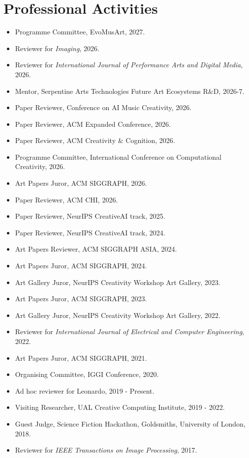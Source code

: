 \documentclass[letterpaper,11pt]{article}
\newcommand{\resumeItem}[2]{
  \item\small{
    \textbf{#1}{ #2 \vspace{-2pt}}
  }
}
\newcommand{\resumeSubItem}[2]{\resumeItem{#1}{#2}\vspace{-4pt}}
\newcommand{\resumeSubHeadingListStart}{\begin{itemize}[leftmargin=*]}
\newcommand{\resumeSubHeadingListEnd}{\end{itemize}}
\begin{document}
\section{Professional Activities}
 \resumeSubHeadingListStart
 \resumeSubItem{}{Programme Committee, EvoMusArt, 2027.}
 \resumeSubItem{}{Reviewer for \textit{Imaging}, 2026.}
 \resumeSubItem{}{Reviewer for \textit{International Journal of Performance Arts and Digital Media}, 2026.}
 \resumeSubItem{}{Mentor, Serpentine Arts Technologies Future Art Ecosystems R\&D, 2026-7.}
 \resumeSubItem{}{Paper Reviewer, Conference on AI Music Creativity, 2026.}
  \resumeSubItem{}{Paper Reviewer, ACM Expanded Conference, 2026.}
  \resumeSubItem{}{Paper Reviewer, ACM Creativity \& Cognition, 2026.}
  \resumeSubItem{}{Programme Committee, International Conference on Computational Creativity, 2026.}
  \resumeSubItem{}{Art Papers Juror, ACM SIGGRAPH, 2026.}
  \resumeSubItem{}{Paper Reviewer, ACM CHI, 2026.}
  \resumeSubItem{}{Paper Reviewer, NeurIPS CreativeAI track, 2025.}
  \resumeSubItem{}{Paper Reviewer, NeurIPS CreativeAI track, 2024.}
  \resumeSubItem{}{Art Papers Reviewer, ACM SIGGRAPH ASIA, 2024.}
  \resumeSubItem{}{Art Papers Juror, ACM SIGGRAPH, 2024.}
  \resumeSubItem{}{Art Gallery Juror, NeurIPS Creativity Workshop Art Gallery, 2023.}
  \resumeSubItem{}{Art Papers Juror, ACM SIGGRAPH, 2023.}
  \resumeSubItem{}{Art Gallery Juror, NeurIPS Creativity Workshop Art Gallery, 2022.}
  \resumeSubItem{}{Reviewer for \textit{International Journal of Electrical and Computer Engineering}, 2022.}
  \resumeSubItem{}{Art Papers Juror, ACM SIGGRAPH, 2021.}
  \resumeSubItem{}{Organising Committee, IGGI Conference, 2020.}
\resumeSubItem{}{Ad hoc reviewer for Leonardo, 2019 - Present.}
 \resumeSubItem{}{Visiting Researcher, UAL Creative Computing Institute, 2019 - 2022.}
  \resumeSubItem{}{Guest Judge, Science Fiction Hackathon, Goldsmiths, University of London, 2018.}
  \resumeSubItem{}{Reviewer for \textit{IEEE Transactions on Image Processing}, 2017.}
 \resumeSubHeadingListEnd

  
\end{document}
